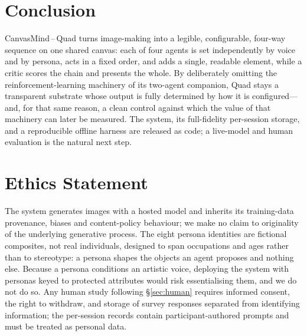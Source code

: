 \documentclass[11pt]{article}
\begin{document}
\section{Conclusion}
CanvasMind\,--\,Quad turns image-making into a legible, configurable, four-way
sequence on one shared canvas: each of four agents is set independently by voice
and by persona, acts in a fixed order, and adds a single, readable element, while a
critic scores the chain and presents the whole. By deliberately omitting the
reinforcement-learning machinery of its two-agent companion, Quad stays a
transparent substrate whose output is fully determined by how it is configured---
and, for that same reason, a clean control against which the value of that
machinery can later be measured. The system, its full-fidelity per-session storage,
and a reproducible offline harness are released as code; a live-model and human
evaluation is the natural next step.

\section*{Ethics Statement}
The system generates images with a hosted model and inherits its training-data
provenance, biases and content-policy behaviour; we make no claim to originality of
the underlying generative process. The eight persona identities are fictional
composites, not real individuals, designed to span occupations and ages rather
than to stereotype: a persona shapes the objects an agent proposes and nothing
else. Because a persona conditions an artistic voice, deploying the system with
personas keyed to protected attributes would risk essentialising them, and we do
not do so. Any human study following \S\ref{sec:human} requires informed consent,
the right to withdraw, and storage of survey responses separated from identifying
information; the per-session records contain participant-authored prompts and must
be treated as personal data.



\appendix

\clearpage
\end{document}
